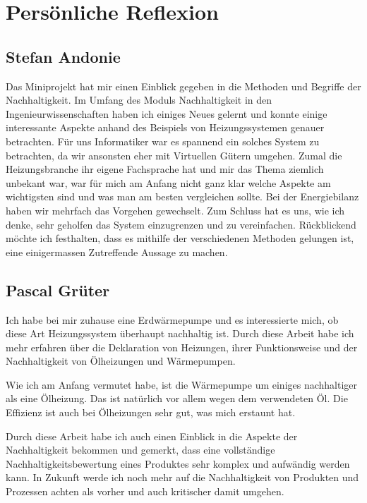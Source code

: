 \chapter{Persönliche Reflexion}
\label{chap:reflexion}

\section{Stefan Andonie}

Das Miniprojekt hat mir einen Einblick gegeben in die Methoden und Begriffe
der Nachhaltigkeit.
Im Umfang des Moduls Nachhaltigkeit in den Ingenieurwissenschaften haben ich
einiges Neues gelernt und konnte einige interessante Aspekte anhand
des Beispiels von Heizungssystemen genauer betrachten.
Für uns Informatiker war es spannend ein solches System zu betrachten, da wir
ansonsten eher mit Virtuellen Gütern umgehen.
Zumal die Heizungsbranche ihr eigene Fachsprache hat und mir das Thema ziemlich
unbekant war, war für mich am Anfang nicht ganz klar welche Aspekte am
wichtigsten sind und was man am besten vergleichen sollte.
Bei der Energiebilanz haben wir mehrfach das Vorgehen gewechselt.
Zum Schluss hat es uns, wie ich denke, sehr geholfen das System einzugrenzen und zu
vereinfachen.
Rückblickend möchte ich festhalten, dass es mithilfe der verschiedenen Methoden
gelungen ist, eine einigermassen Zutreffende Aussage zu machen.

\section{Pascal Grüter}

Ich habe bei mir zuhause eine Erdwärmepumpe und es interessierte mich, ob diese Art Heizungssystem überhaupt nachhaltig ist. Durch diese Arbeit habe ich mehr erfahren über die Deklaration von Heizungen, ihrer Funktionsweise und der Nachhaltigkeit von Ölheizungen und Wärmepumpen.

Wie ich am Anfang vermutet habe, ist die Wärmepumpe um einiges nachhaltiger als eine Ölheizung. Das ist natürlich vor allem wegen dem verwendeten Öl. Die Effizienz ist auch bei Ölheizungen sehr gut, was mich erstaunt hat.

Durch diese Arbeit habe ich auch einen Einblick in die Aspekte der Nachhaltigkeit bekommen und gemerkt, dass eine vollständige Nachhaltigkeitsbewertung eines Produktes sehr komplex und aufwändig werden kann.
In Zukunft werde ich noch mehr auf die Nachhaltigkeit von Produkten und Prozessen achten als vorher und auch kritischer damit umgehen.

